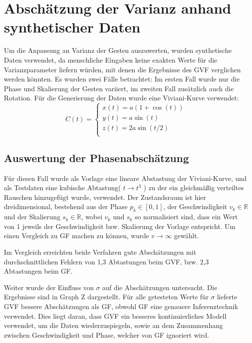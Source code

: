 \documentclass{llncs}
\begin{document}
\section{Abschätzung der Varianz anhand synthetischer Daten}
Um die Anpassung an Varianz der Gesten auszuwerten, wurden synthetische Daten verwendet, da menschliche Eingaben keine exakten Werte für die Varianzparameter liefern würden, mit denen die Ergebnisse des GVF verglichen werden könnten. Es wurden zwei Fälle betrachtet: Im ersten Fall wurde nur die Phase und Skalierung der Gesten variiert, im zweiten Fall zusätzlich auch die Rotation. Für die Generierung der Daten wurde eine Viviani-Kurve verwendet:
\begin{equation}
C(t)=\left\{\begin{array}{l}
x(t)=a(1+\cos(t))\\
y(t)=a\sin(t)\\
z(t)=2a\sin(t/2)\\
\end{array}\right.
\end{equation} 

\subsection{Auswertung der Phasenabschätzung}
Für diesen Fall wurde als Vorlage eine lineare Abstastung der Viviani-Kurve, und als Testdaten eine kubische Abtastung( $ t \rightarrow t^3 $ ) zu der ein gleichmäßig verteiltes Rauschen hinzugefügt wurde, verwendet. Der Zustandsraum ist hier dreidimensional, bestehend aus der Phase $ p_k \in [0,1] $, der Geschwindigkeit $v_k \in \mathbb{R}$ und der Skalierung $s_k \in \mathbb{R}$, wobei $v_k$ und $s_k$ so normalisiert sind, dass ein Wert von 1 jeweils der Geschwindigkeit bzw. Skalierung der Vorlage entspricht. Um einen Vergleich zu GF machen zu können, wurde $v \rightarrow \infty$ gewählt.

Im Vergleich erreichten beide Verfahren gute Abschätzungen mit durchschnittlichen Fehlern von 1,3 Abtastungen beim GVF, bzw. 2,3 Abtastungen beim GF.

Weiter wurde der Einfluss von $\sigma$ auf die Abschätzungen untersucht. Die Ergebnisse sind in Graph Z dargestellt. Für alle getesteten Werte für $\sigma$ lieferte GVF bessere Abschätzungen als GF, obwohl GF eine genauere Inferenztechnik verwendet. Dies liegt daran, dass GVF ein besseres kontinuierliches Modell verwendet, um die Daten wiederzuspiegeln, sowie an dem Zusammenhang zwischen Geschwindigkeit und Phase, welcher von GF ignoriert wird.
\end{document}
